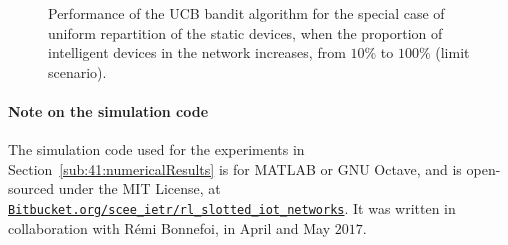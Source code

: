 \begin{figure}[!t]
{    \label{fig:41:ch2_50}}
    \hfill
    \caption{Performance of the UCB bandit algorithm for the special case of uniform repartition of the static devices, when the proportion of intelligent devices in the network increases, from $10\%$ to $100\%$ (limit scenario).}
    \label{fig:41:figure4appendix}
\end{figure}



\paragraph{Note on the simulation code}

The simulation code used for the experiments in Section~\ref{sub:41:numericalResults} is for MATLAB or GNU Octave,
and is open-sourced under the MIT License, at\\
\href{https://Bitbucket.org/scee_ietr/rl_slotted_iot_networks}{\texttt{Bitbucket.org/scee\_ietr/rl\_slotted\_iot\_networks}}.
It was written in collaboration with Rémi Bonnefoi, in April and May $2017$.
